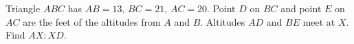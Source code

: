 Triangle $ABC$ has $AB=13$, $BC=21$, $AC=20$. Point $D$ on $BC$ and point $E$ on $AC$ are the feet of the altitudes from $A$ and $B$. Altitudes $AD$ and $BE$ meet at $X$. Find $AX:XD$.
